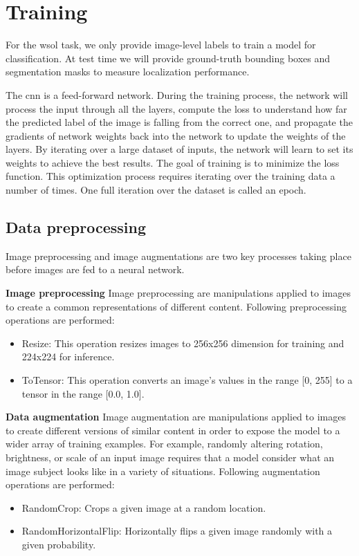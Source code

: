 \section{Training}
For the \acrlong{wsol} task, we only provide image-level labels to train a model for classification. At test time we will provide ground-truth bounding boxes and segmentation masks  to measure localization performance.

The \acrshort{cnn} is a feed-forward network. During the training process, the network will process the input through all the layers, compute the loss to understand how far the predicted label of the image is falling from the correct one, and propagate the gradients of network weights back into the network to update the weights of the layers. By iterating over a large dataset of inputs, the network will learn to set its weights to achieve the best results. The goal of training is to minimize the loss function. This optimization process requires iterating over the training data a number of times. One full iteration over the dataset is called an epoch.

\subsection{Data preprocessing}
Image preprocessing and image augmentations are two key processes taking place before images are fed to a neural network.

\textbf{Image preprocessing}
Image preprocessing are manipulations applied to images to create a common representations of different content. Following preprocessing operations are performed:
\begin{itemize}
    \item Resize: This operation resizes images to 256x256 dimension for training and 224x224 for inference.
    \item ToTensor: This operation converts an image's values in the range [0, 255] to a tensor in the range [0.0, 1.0].
\end{itemize}
\textbf{Data augmentation}
Image augmentation are manipulations applied to images to create different versions of similar content in order to expose the model to a wider array of training examples. For example, randomly altering rotation, brightness, or scale of an input image requires that a model consider what an image subject looks like in a variety of situations. Following augmentation operations are performed:
\begin{itemize}
    \item RandomCrop: Crops a given image at a random location.
    \item RandomHorizontalFlip: Horizontally flips a given image randomly with a given probability.
\end{itemize}

